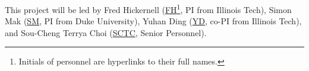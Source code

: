 \documentclass[11pt]{NSFamsart}
\newcommand{\cmtS}[1]{{\color{blue}{(Simon: #1)}}}
\newcommand{\FH}{\hyperlink{FHlink}{FH}\xspace}
\newcommand{\SM}{\hyperlink{SMlink}{SM}\xspace}
\newcommand{\SCTC}{\hyperlink{SCTClink}{SCTC}\xspace}
\newcommand{\YD}{\hyperlink{YDlink}{YD}\xspace}
\begin{document}
This project will be led by \hypertarget{FHlink}{Fred Hickernell} (\FH\footnote{Initials of personnel are hyperlinks to their full names.}, PI from Illinois Tech), \hypertarget{SMlink}{Simon Mak} (\SM, PI from Duke University), \hypertarget{YDlink}{Yuhan Ding} (\YD, co-PI from Illinois Tech), and \hypertarget{SCTClink}{Sou-Cheng Terrya Choi} (\SCTC, Senior Personnel).

 


\end{document}
